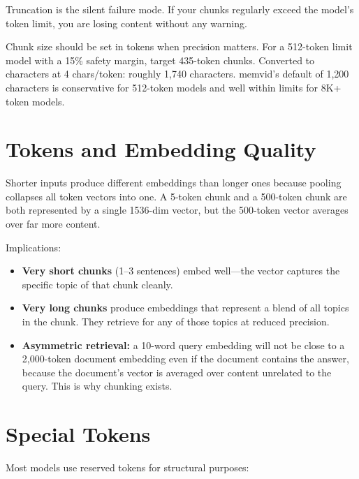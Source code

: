 Truncation is the silent failure mode. If your chunks regularly exceed the model's token limit,
you are losing content without any warning.

Chunk size should be set in tokens when precision matters. For a 512-token limit model with a
15\% safety margin, target 435-token chunks. Converted to characters at 4 chars/token: roughly
1{,}740 characters. memvid's default of 1{,}200 characters is conservative for 512-token models
and well within limits for 8K+ token models.

\section{Tokens and Embedding Quality}

Shorter inputs produce different embeddings than longer ones because pooling collapses all
token vectors into one. A 5-token chunk and a 500-token chunk are both represented by a single
1536-dim vector, but the 500-token vector averages over far more content.

Implications:

\begin{itemize}
    \item \textbf{Very short chunks} (1--3 sentences) embed well---the vector captures the
          specific topic of that chunk cleanly.
    \item \textbf{Very long chunks} produce embeddings that represent a blend of all topics in
          the chunk. They retrieve for any of those topics at reduced precision.
    \item \textbf{Asymmetric retrieval:} a 10-word query embedding will not be close to a
          2{,}000-token document embedding even if the document contains the answer, because the
          document's vector is averaged over content unrelated to the query. This is why chunking
          exists.
\end{itemize}

\section{Special Tokens}

Most models use reserved tokens for structural purposes:

